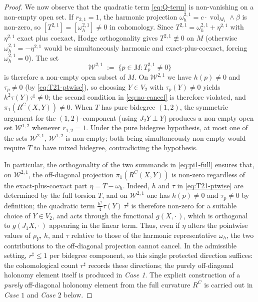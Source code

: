 \documentclass[11pt,reqno]{amsart}
\theoremstyle{plain}
\theoremstyle{definition}
\numberwithin{equation}{section}
\begin{document}
\begin{proof}
We now observe that the quadratic
term \eqref{eq:Q-term} is non-vanishing on a
non-empty open set.
If $r_{2,1}=1$, the harmonic projection
$\omega_h^{2,1}
=c\cdot\operatorname{vol}_{M_1}\wedge\beta$
is non-zero, so
$[T^{2,1}]=[\omega_h^{2,1}]\neq 0$
in cohomology.
Since $T^{2,1}=\omega_h^{2,1}+\eta^{2,1}$
with $\eta^{2,1}$ exact plus coexact,
Hodge orthogonality gives
$T^{2,1}\not\equiv 0$ on $M$
(otherwise $\omega_h^{2,1}=-\eta^{2,1}$ would
be simultaneously harmonic and
exact-plus-coexact, forcing
$\omega_h^{2,1}=0$).
The set
\begin{equation}\label{eq:W21-def}
  \mathcal{W}^{2,1}
  \;:=\;
  \{p\in M:T^{2,1}_p\neq 0\}
\end{equation}
is therefore a non-empty open subset of $M$.
On $\mathcal{W}^{2,1}$ we have
$h(p)\neq 0$ and $\tau_p\neq 0$
(by \eqref{eq:T21-ptwise}), so choosing
$Y\in V_2$ with $\tau_p(Y)\neq 0$
yields
$h^2\tau(Y)\tau^{\sharp}\neq 0$;
the second condition in \eqref{eq:no-cancel}
is therefore violated, and
$\pi_1(R^C(X,Y))\neq 0$.
When $T$ has pure bidegree $(1,2)$, the symmetric argument for the $(1,2)$-component (using $J_2Y\perp Y$) produces a non-empty open set $\mathcal{W}^{1,2}$ whenever $r_{1,2}=1$. Under the pure bidegree hypothesis, at most one of the sets $\mathcal{W}^{2,1}$, $\mathcal{W}^{1,2}$ is non-empty; both being simultaneously non-empty would require $T$ to have mixed bidegree, contradicting the hypothesis.

In particular, the orthogonality of the two summands 
in \eqref{eq:pi1-full} ensures that, on $\mathcal{W}^{2,1}$, the off-diagonal projection $\pi_1(R^C(X,Y))$ is non-zero regardless of the exact-plus-coexact part $\eta = T - \omega_h$. Indeed, $h$ and $\tau$ in \eqref{eq:T21-ptwise} are 
determined by the full torsion $T$, and on $\mathcal{W}^{2,1}$ one has $h(p)\neq 0$ and $\tau_p\neq 0$ by definition; the quadratic term $\tfrac{h^2}{4}\tau(Y)\,\tau^\sharp$ is therefore non-zero for a suitable choice of $Y\in V_2$, and acts through the functional $g(X,\cdot\,)$, which is orthogonal to $g(J_1X,\cdot\,)$ appearing in the linear term.  Thus, even if $\eta$ alters the pointwise values of $\rho_Y$, $h$, and $\tau$ relative to those of the harmonic representative $\omega_h$, the two contributions to the off-diagonal projection cannot cancel.  In the admissible setting, 
$r^\sharp\leq 1$ per bidegree component, so this single protected direction suffices: the cohomological count $r^\sharp$ records these directions; the purely off-diagonal holonomy element itself is produced in \emph{Case 1}. The explicit construction of a \emph{purely} off-diagonal holonomy element from the full 
curvature $R^C$ is carried out in \emph{Case $1$} and \emph{Case $2$} below.


\end{proof}
\end{document}
